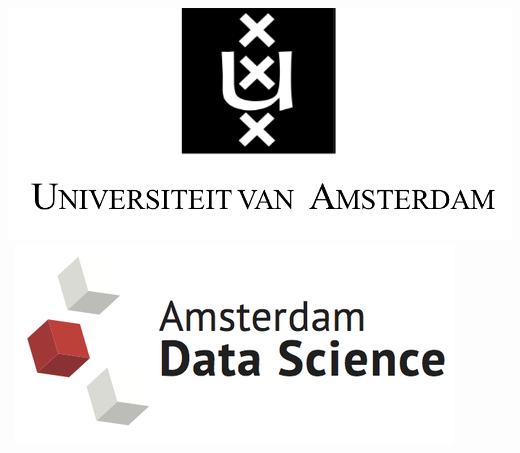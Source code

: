 \begin{titlepage}
\bigskip

\begin{center}
\mbox{\includegraphics[width=.2\paperwidth]{logo-uva.png} 
\includegraphics[width=.2\paperwidth]{ads.png}
}
\end{center}
\end{titlepage}

%
%
%
